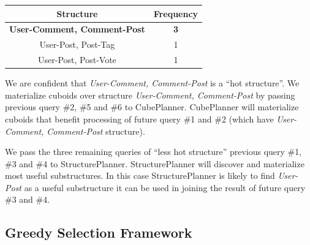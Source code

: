 \begin{center}
\begin{tabular}{ | c | c |}  
	\hline
	Structure	&Frequency	\\ \hline 
	\textbf{User-Comment, Comment-Post} 	&\textbf{3} \\ \hline
	User-Post, Post-Tag 	&1 \\ \hline
	User-Post, Post-Vote	&1 \\ \hline
\end{tabular}
\end {center}
\par	
We are confident that \textit{User-Comment, Comment-Post} is a ``hot structure''. We materialize cuboids over structure \textit{User-Comment, Comment-Post} by passing previous query \#2, \#5 and \#6 to CubePlanner. CubePlanner will materialize cuboids that benefit processing of future query \#1 and \#2 (which have \textit{User-Comment, Comment-Post} structure).
\par
We pass the three remaining queries of ``less hot structure'' previous query \#1, \#3 and \#4 to StructurePlanner. StructurePlanner will discover and materialize most useful substructures. In this case StructurePlanner is likely to find \textit{User-Post} as a useful substructure it can be used in joining the result of future query \#3 and \#4.
\subsection{Greedy Selection Framework}

